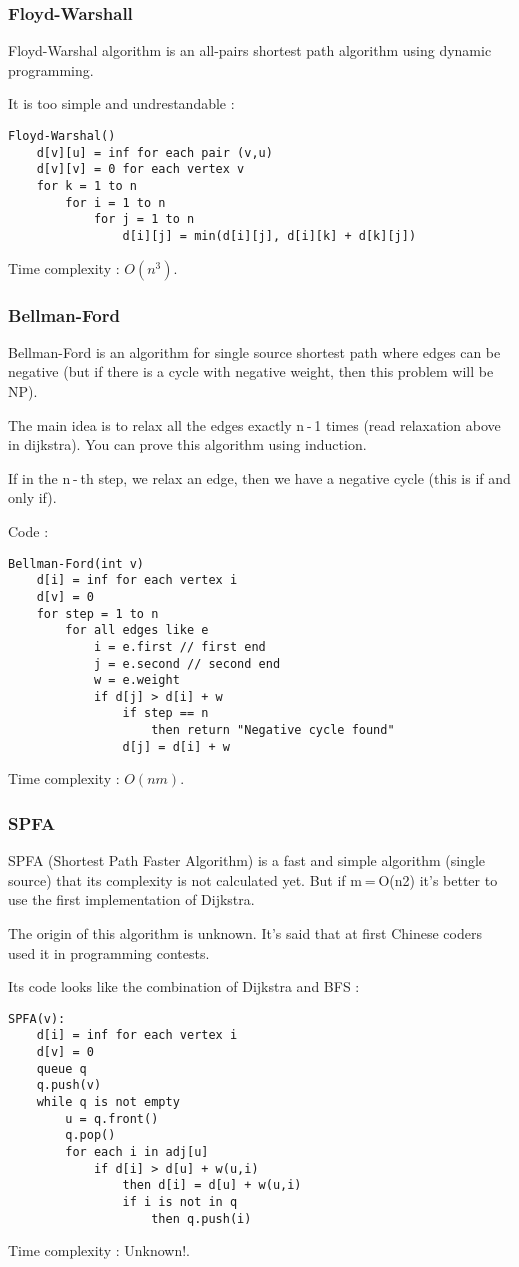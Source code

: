 \subsubsection{Floyd-Warshall}
Floyd-Warshal algorithm is an all-pairs shortest path algorithm using dynamic programming.

It is too simple and undrestandable :
\begin{verbatim}
Floyd-Warshal()
	d[v][u] = inf for each pair (v,u)
	d[v][v] = 0 for each vertex v
	for k = 1 to n
		for i = 1 to n
			for j = 1 to n
                d[i][j] = min(d[i][j], d[i][k] + d[k][j])
\end{verbatim}
Time complexity : $O(n^3)$.
\subsubsection{Bellman-Ford}
Bellman-Ford is an algorithm for single source shortest path where edges can be negative (but if there is a cycle with negative weight, then this problem will be NP).

The main idea is to relax all the edges exactly n - 1 times (read relaxation above in dijkstra). You can prove this algorithm using induction.

If in the n - th step, we relax an edge, then we have a negative cycle (this is if and only if).

Code :
\begin{verbatim}
Bellman-Ford(int v)
	d[i] = inf for each vertex i
	d[v] = 0
	for step = 1 to n
		for all edges like e
			i = e.first // first end
			j = e.second // second end
			w = e.weight
			if d[j] > d[i] + w
				if step == n
					then return "Negative cycle found"
                d[j] = d[i] + w
\end{verbatim}
Time complexity : $O(nm)$.
\subsubsection{SPFA}
SPFA (Shortest Path Faster Algorithm) is a fast and simple algorithm (single source) that its complexity is not calculated yet. But if m = O(n2) it's better to use the first implementation of Dijkstra.

The origin of this algorithm is unknown. It's said that at first Chinese coders used it in programming contests.

Its code looks like the combination of Dijkstra and BFS :
\begin{verbatim}
SPFA(v):
	d[i] = inf for each vertex i
	d[v] = 0
	queue q
	q.push(v)
	while q is not empty
		u = q.front()
		q.pop()
		for each i in adj[u]
			if d[i] > d[u] + w(u,i)
				then d[i] = d[u] + w(u,i)
				if i is not in q
                    then q.push(i)
\end{verbatim}
Time complexity : Unknown!.
